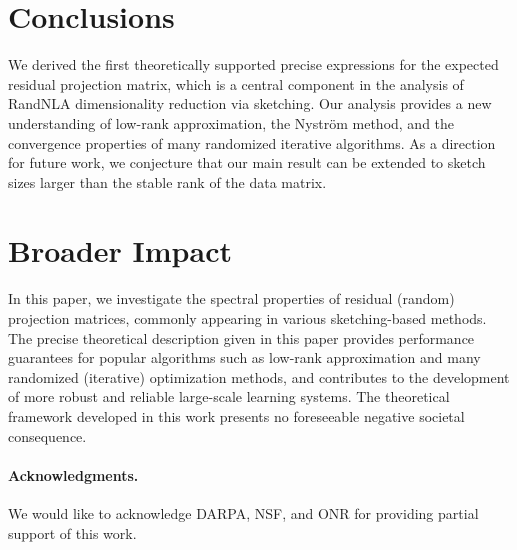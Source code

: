 \documentclass[thesis.tex]{subfiles}
\begin{document}
\section{Conclusions}

We derived the first theoretically supported precise expressions for the
expected residual projection matrix, which is a central component in
the analysis of RandNLA dimensionality reduction via sketching. Our
analysis provides a new understanding of low-rank approximation, the Nystr\"om method, and the
convergence properties of many randomized iterative algorithms. As a direction for future work, we conjecture that our
main result can be extended to sketch sizes larger than the stable
rank of the data matrix.

\ifisarxiv\else
\section*{Broader Impact}
In this paper, we investigate the spectral properties of residual
(random) projection matrices, commonly appearing in various
sketching-based methods. The precise theoretical description given in
this paper provides performance guarantees for popular algorithms
such as low-rank approximation and many randomized (iterative)
optimization methods, and contributes to the development of more
robust and reliable large-scale learning systems. The
theoretical framework developed in this work presents no foreseeable
negative societal consequence. 
\fi


\paragraph{Acknowledgments.}
We would like to acknowledge DARPA, NSF, and ONR for providing partial support of this work.


% 
% 



\end{document}

